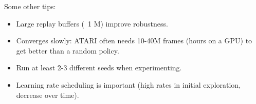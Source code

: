 \documentclass{tufte-handout}
\begin{document}
Some other tips:
\begin{itemize}
\item Large replay buffers (~1 M) improve robustness.
\item Converges slowly: ATARI often needs 10-40M frames (hours on a GPU) to get better than a random policy.
\item Run at least 2-3 different seeds when experimenting.
\item Learning rate scheduling is important (high rates in initial exploration, decrease over time).
\end{itemize}



% 
\end{document}

